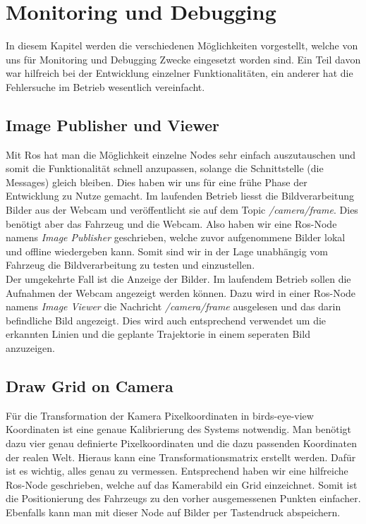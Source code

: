 \section{Monitoring und Debugging}
\label{sec:monitoring}


In diesem Kapitel werden die verschiedenen M\"oglichkeiten vorgestellt, welche von uns f\"ur Monitoring und Debugging Zwecke eingesetzt worden sind. Ein Teil davon war hilfreich bei der Entwicklung einzelner Funktionalit\"aten, ein anderer hat die Fehlersuche im Betrieb wesentlich vereinfacht.

\subsection{Image Publisher und Viewer}
Mit Ros hat man die M\"oglichkeit einzelne Nodes sehr einfach auszutauschen und somit die Funktionalit\"at schnell anzupassen, solange die Schnittstelle (die Messages) gleich bleiben. Dies haben wir uns f\"ur eine fr\"uhe Phase der Entwicklung zu Nutze gemacht. Im laufenden Betrieb liesst die Bildverarbeitung Bilder aus der Webcam und ver\"offentlicht sie auf dem Topic \textit{/camera/frame}. Dies ben\"otigt aber das Fahrzeug und die Webcam. Also haben wir eine Ros-Node namens \textit{Image Publisher} geschrieben, welche zuvor aufgenommene Bilder lokal und offline wiedergeben kann. Somit sind wir in der Lage unabh\"angig vom Fahrzeug die Bildverarbeitung zu testen und einzustellen.\\

Der umgekehrte Fall ist die Anzeige der Bilder. Im laufendem Betrieb sollen die Aufnahmen der Webcam angezeigt werden k\"onnen. Dazu wird in einer Ros-Node namens \textit{Image Viewer} die Nachricht \textit{/camera/frame} ausgelesen und das darin befindliche Bild angezeigt. Dies wird auch entsprechend verwendet um die erkannten Linien und die geplante Trajektorie in einem seperaten Bild anzuzeigen. 

\subsection{Draw Grid on Camera}
F\"ur die Transformation der Kamera Pixelkoordinaten in birds-eye-view Koordinaten ist eine genaue Kalibrierung des Systems notwendig. Man ben\"otigt dazu vier genau definierte Pixelkoordinaten und die dazu passenden Koordinaten der realen Welt. Hieraus kann eine Transformationsmatrix erstellt werden. Daf\"ur ist es wichtig, alles genau zu vermessen. Entsprechend haben wir eine hilfreiche Ros-Node geschrieben, welche auf das Kamerabild ein Grid einzeichnet. Somit ist die Positionierung des Fahrzeugs zu den vorher ausgemessenen Punkten einfacher. Ebenfalls kann man mit dieser Node auf Bilder per Tastendruck abspeichern.

